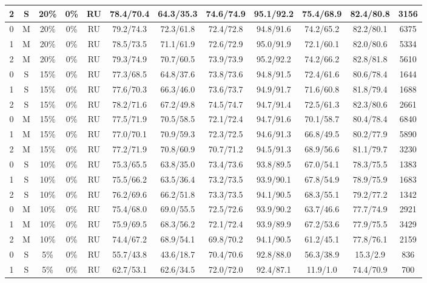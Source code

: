 \begin{table*}
{\begin{tabular}{|c|c|c|c|c||c|c|c|c|c|c||c|}
2 & S & 20\% & 0\% & RU & 78.4/70.4 & 64.3/35.3 & 74.6/74.9 & 95.1/92.2 & 75.4/68.9 & 82.4/80.8 & 3156 \\ \hline
0 & M & 20\% & 0\% & RU & 79.2/74.3 & 72.3/61.8 & 72.4/72.8 & 94.8/91.6 & 74.2/65.2 & 82.2/80.1 & 6375 \\ \hline
1 & M & 20\% & 0\% & RU & 78.5/73.5 & 71.1/61.9 & 72.6/72.9 & 95.0/91.9 & 72.1/60.1 & 82.0/80.6 & 5334 \\ \hline
2 & M & 20\% & 0\% & RU & 79.3/74.9 & 70.7/60.5 & 73.9/73.9 & 95.2/92.2 & 74.2/66.2 & 82.8/81.8 & 5610 \\ \hline
0 & S & 15\% & 0\% & RU & 77.3/68.5 & 64.8/37.6 & 73.8/73.6 & 94.8/91.5 & 72.4/61.6 & 80.6/78.4 & 1644 \\ \hline
1 & S & 15\% & 0\% & RU & 77.6/70.3 & 66.3/46.0 & 73.6/73.7 & 94.9/91.7 & 71.6/60.8 & 81.8/79.4 & 1688 \\ \hline
2 & S & 15\% & 0\% & RU & 78.2/71.6 & 67.2/49.8 & 74.5/74.7 & 94.7/91.4 & 72.5/61.3 & 82.3/80.6 & 2661 \\ \hline
0 & M & 15\% & 0\% & RU & 77.5/71.9 & 70.5/58.5 & 72.1/72.4 & 94.7/91.6 & 70.1/58.7 & 80.4/78.4 & 6840 \\ \hline
1 & M & 15\% & 0\% & RU & 77.0/70.1 & 70.9/59.3 & 72.3/72.5 & 94.6/91.3 & 66.8/49.5 & 80.2/77.9 & 5890 \\ \hline
2 & M & 15\% & 0\% & RU & 77.2/71.9 & 70.8/60.9 & 70.7/71.2 & 94.5/91.3 & 68.9/56.6 & 81.1/79.7 & 3230 \\ \hline
0 & S & 10\% & 0\% & RU & 75.3/65.5 & 63.8/35.0 & 73.4/73.6 & 93.8/89.5 & 67.0/54.1 & 78.3/75.5 & 1383 \\ \hline
1 & S & 10\% & 0\% & RU & 75.5/66.2 & 63.5/36.4 & 73.2/73.5 & 93.9/90.1 & 67.8/54.9 & 78.9/75.9 & 1683 \\ \hline
2 & S & 10\% & 0\% & RU & 76.2/69.6 & 66.2/51.8 & 73.3/73.5 & 94.1/90.5 & 68.3/55.1 & 79.2/77.2 & 1342 \\ \hline
0 & M & 10\% & 0\% & RU & 75.4/68.0 & 69.0/55.5 & 72.5/72.6 & 93.9/90.2 & 63.7/46.6 & 77.7/74.9 & 2921 \\ \hline
1 & M & 10\% & 0\% & RU & 75.9/69.5 & 68.3/56.2 & 72.1/72.4 & 93.9/89.9 & 67.2/53.6 & 77.9/75.5 & 3429 \\ \hline
2 & M & 10\% & 0\% & RU & 74.4/67.2 & 68.9/54.1 & 69.8/70.2 & 94.1/90.5 & 61.2/45.1 & 77.8/76.1 & 2159 \\ \hline
0 & S & 5\% & 0\% & RU & 55.7/43.8 & 43.6/18.7 & 70.4/70.6 & 92.8/88.0 & 56.3/38.9 & 15.3/2.9 & 836 \\ \hline
1 & S & 5\% & 0\% & RU & 62.7/53.1 & 62.6/34.5 & 72.0/72.0 & 92.4/87.1 & 11.9/1.0 & 74.4/70.9 & 700 \\ \hline

\end{tabular}}
\end{table*}
